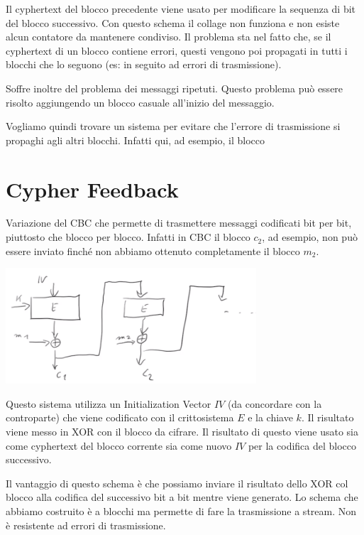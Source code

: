 \noindent Il cyphertext del blocco precedente viene usato per modificare la sequenza di bit del blocco successivo. Con questo schema il collage non funziona e non esiste alcun contatore da mantenere condiviso. Il problema sta nel fatto che, se il cyphertext di un blocco contiene errori, questi vengono poi propagati in tutti i blocchi che lo seguono (es: in seguito ad errori di trasmissione).

Soffre inoltre del problema dei messaggi ripetuti. Questo problema può essere risolto aggiungendo un blocco casuale all'inizio del messaggio.

Vogliamo quindi trovare un sistema per evitare che l'errore di trasmissione si propaghi agli altri blocchi. Infatti qui, ad esempio, il blocco 

\section{Cypher Feedback}
Variazione del CBC che permette di trasmettere messaggi codificati bit per bit, piuttosto che blocco per blocco. Infatti in CBC il blocco $c_2$, ad esempio, non può essere inviato finché non abbiamo ottenuto completamente il blocco $m_2$.

\begin{center}
    \includegraphics[width=0.7\textwidth]{images/CF.png}
\end{center}

\noindent Questo sistema utilizza un Initialization Vector $IV$ (da concordare con la controparte) che viene codificato con il crittosistema $E$ e la chiave $k$. Il risultato viene messo in XOR con il blocco da cifrare. Il risultato di questo viene usato sia come cyphertext del blocco corrente sia come nuovo $IV$ per la codifica del blocco successivo.

Il vantaggio di questo schema è che possiamo inviare il risultato dello XOR col blocco alla codifica del successivo bit a bit mentre viene generato. Lo schema che abbiamo costruito è a blocchi ma permette di fare la trasmissione a stream. Non è resistente ad errori di trasmissione. 

